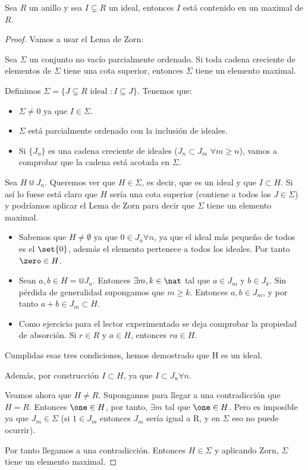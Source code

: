 \begin{theorem}
	Sea $R$ un anillo y sea $I \subsetneq R$ un ideal, entonces $I$ está contenido en un maximal de $R$.
\end{theorem}
\begin{proof}
Vamos a usar el Lema de Zorn:
\begin{lemma} \label{lem:Zorn}
Sea $\Sigma$ un conjunto no vacío parcialmente ordenado. Si toda cadena creciente de elementos de $\Sigma$ tiene una cota superior, entonces $\Sigma$ tiene un elemento maximal.
\end{lemma}

Definimos $\Sigma = \{J \subsetneq R \text{ ideal }: I\subseteq J \}$. Tenemos que:
\begin{itemize}
	\item $\Sigma \neq 0$ ya que $I \in \Sigma$.
	\item $\Sigma$ está parcialmente ordenado con la inclusión de ideales.
	\item Si $\{ J_n\}$ es una cadena creciente de ideales ($J_n \subset J_m$ $\forall m\geq n$), vamos a comprobar que la cadena está acotada en $\Sigma$.
\end{itemize}
Sea $H \Cup J_n$. Queremos ver que $H \in \Sigma$, es decir, que es un ideal y que $I \subset H$. Si así lo fuese está claro que $H$ sería una cota superior (contiene a todos los $J \in \Sigma$) y podríamos aplicar el Lema de Zorn para decir que $\Sigma$ tiene un elemento maximal.

\begin{itemize}
	\item Sabemos que $H \neq \emptyset$ ya que $0 \in J_n \forall n$, ya que el ideal más pequeño de todos es el $\set{0}$, además el elemento \zero pertenece a todos los ideales. Por tanto $\zero \in H$.
	\item Sean $a,b \in H=\Cup J_n$.  Entonces $\exists m,k \in \nat$ tal que $a \in J_m$ y $b \in J_k$. Sin pérdida de generalidad supongamos que $m \geq k$. Entonces $a,b \in J_m$, y por tanto $a+b \in J_m \subset H$.
	\item Como ejercicio para el lector experimentado se deja comprobar la propiedad de absorción. Si $r\in R$ y $a \in H$, entonces $ra \in H$.
\end{itemize}
Cumplidas esas tres condiciones, hemos demostrado que H es un ideal.

Además, por construcción $I \subset H$, ya que $I \subset J_n \forall n$.

Veamos ahora que $H \neq R$. Supongamos para llegar a una contradicción que $H=R$. Entonces $\one \in H$, por tanto, $\exists m$ tal que $\one \in H$. Pero es imposible ya que $J_m \in \Sigma$ (si $1 \in J_m$ entonces $J_m$ sería igual a R, y en $\Sigma$ eso no puede ocurrir).

Por tanto llegamos a una contradicción. Entonces $H \in \Sigma$ y aplicando Zorn, $\Sigma$ tiene un elemento maximal.
\end{proof}


